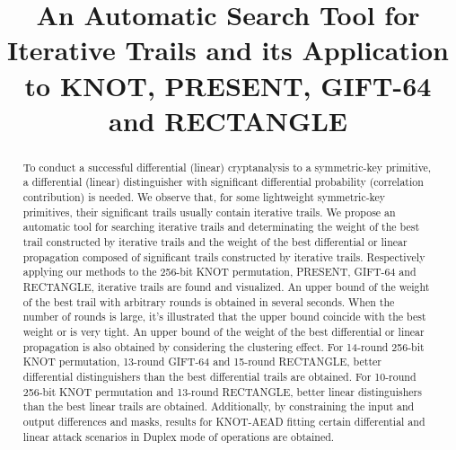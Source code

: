 \documentclass[runningheads]{llncs}
\begin{document}
%
\title{An Automatic Search Tool for Iterative Trails and its Application to KNOT, PRESENT, GIFT-64 and RECTANGLE 
}
%
%
%
%
%
\maketitle              %
%
\begin{abstract}
To conduct a successful differential (linear) cryptanalysis to a symmetric-key primitive, a differential (linear) distinguisher with significant differential probability (correlation contribution) is needed. We observe that, for some lightweight symmetric-key primitives, their significant trails usually contain iterative trails. We propose an automatic tool for searching iterative trails and determinating the weight of the best trail constructed by iterative trails and the weight of the best differential or linear propagation composed of significant trails constructed by iterative trails. Respectively applying our methods to the 256-bit KNOT permutation, PRESENT, GIFT-64 and RECTANGLE, iterative trails are found and visualized. An upper bound of the weight of the best trail with arbitrary rounds is obtained in several seconds. When the number of rounds is large, it's illustrated that the upper bound coincide with the best weight or is very tight. An upper bound of the weight of the best differential or linear propagation is also obtained by considering the clustering effect. For 14-round 256-bit KNOT permutation, 13-round GIFT-64 and 15-round RECTANGLE, better differential distinguishers than the best differential trails are obtained. For 10-round 256-bit KNOT permutation and 13-round RECTANGLE, better linear distinguishers than the best linear trails are obtained. Additionally, by constraining the input and output differences and masks, results for KNOT-AEAD fitting certain differential and linear attack scenarios in Duplex mode of operations are obtained. 

\end{abstract}

%


%
%
%
%
%
%


%
\end{document}
